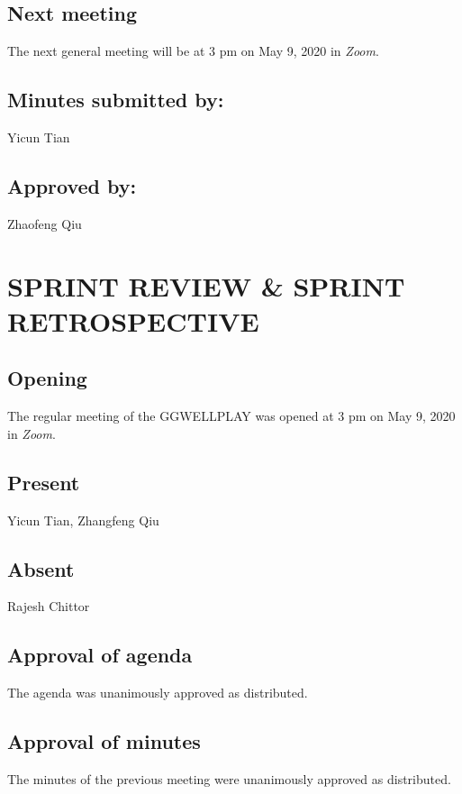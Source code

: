 \documentclass{report}
\begin{document}
\subsection*{Next meeting}
The next general meeting will be at 3 pm on May 9, 2020 in \textit{Zoom}.

\subsection*{Minutes submitted by:} 
Yicun Tian

\subsection*{Approved by:} 
Zhaofeng Qiu

\clearpage
\section*{SPRINT REVIEW \& SPRINT RETROSPECTIVE
}
\subsection*{Opening}
The regular meeting of the GGWELLPLAY was opened at 3 pm on May 9, 2020 in \textit{Zoom}.

\subsection*{Present}
Yicun Tian, Zhangfeng Qiu

\subsection*{Absent}
Rajesh Chittor

\subsection*{Approval of agenda}
The agenda was unanimously approved as distributed.

\subsection*{Approval of minutes}
The minutes of the previous meeting were unanimously approved as distributed.
\end{document}

